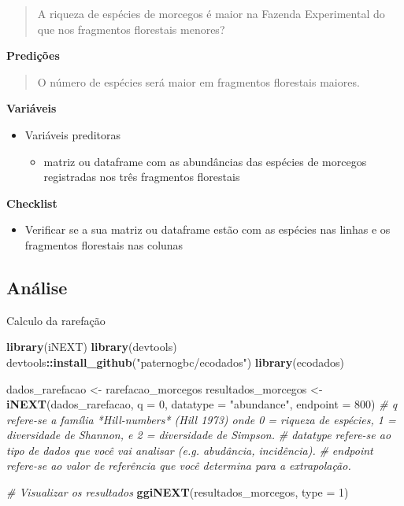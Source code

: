 \documentclass[
]{book}
\newenvironment{Shaded}{\begin{snugshade}}{\end{snugshade}}
\newcommand{\CommentTok}[1]{\textcolor[rgb]{0.56,0.35,0.01}{\textit{#1}}}
\newcommand{\DataTypeTok}[1]{\textcolor[rgb]{0.13,0.29,0.53}{#1}}
\newcommand{\DecValTok}[1]{\textcolor[rgb]{0.00,0.00,0.81}{#1}}
\newcommand{\KeywordTok}[1]{\textcolor[rgb]{0.13,0.29,0.53}{\textbf{#1}}}
\newcommand{\NormalTok}[1]{#1}
\newcommand{\OperatorTok}[1]{\textcolor[rgb]{0.81,0.36,0.00}{\textbf{#1}}}
\newcommand{\StringTok}[1]{\textcolor[rgb]{0.31,0.60,0.02}{#1}}
\providecommand{\tightlist}{%
  \setlength{\itemsep}{0pt}\setlength{\parskip}{0pt}}
\begin{document}
\begin{quote}
A riqueza de espécies de morcegos é maior na Fazenda Experimental do que nos fragmentos florestais menores?
\end{quote}

\textbf{Predições}

\begin{quote}
O número de espécies será maior em fragmentos florestais maiores.
\end{quote}

\textbf{Variáveis}

\begin{itemize}
\tightlist
\item
  Variáveis preditoras

  \begin{itemize}
  \tightlist
  \item
    matriz ou dataframe com as abundâncias das espécies de morcegos registradas nos três fragmentos florestais
  \end{itemize}
\end{itemize}

\textbf{Checklist}

\begin{itemize}
\tightlist
\item
  Verificar se a sua matriz ou dataframe estão com as espécies nas linhas e os fragmentos florestais nas colunas
\end{itemize}

\hypertarget{anuxe1lise}{%
\subsection{Análise}\label{anuxe1lise}}

Calculo da rarefação

\begin{Shaded}
\begin{Highlighting}[]
\KeywordTok{library}\NormalTok{(iNEXT)}
\KeywordTok{library}\NormalTok{(devtools)}
\NormalTok{devtools}\OperatorTok{::}\KeywordTok{install_github}\NormalTok{(}\StringTok{"paternogbc/ecodados"}\NormalTok{)}
\KeywordTok{library}\NormalTok{(ecodados)}

\NormalTok{dados_rarefacao <-}\StringTok{ }\NormalTok{rarefacao_morcegos}
\NormalTok{resultados_morcegos <-}\StringTok{ }\KeywordTok{iNEXT}\NormalTok{(dados_rarefacao, }\DataTypeTok{q =} \DecValTok{0}\NormalTok{, }\DataTypeTok{datatype =} \StringTok{"abundance"}\NormalTok{, }\DataTypeTok{endpoint =} \DecValTok{800}\NormalTok{)}
\CommentTok{# q refere-se a família *Hill-numbers* (Hill 1973) onde 0 = riqueza de espécies, 1 =  diversidade de Shannon, e 2 = diversidade de Simpson.}
\CommentTok{# datatype refere-se ao tipo de dados que você vai analisar (e.g. abudância, incidência).}
\CommentTok{# endpoint refere-se ao valor de referência que você determina para a extrapolação.}

\CommentTok{# Visualizar os resultados }
\KeywordTok{ggiNEXT}\NormalTok{(resultados_morcegos, }\DataTypeTok{type =} \DecValTok{1}\NormalTok{)}
\end{Highlighting}
\end{Shaded}
\end{document}
